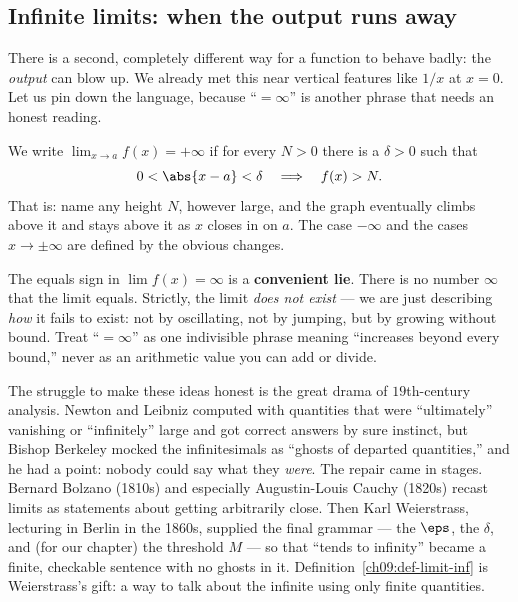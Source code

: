 \subsection{Infinite limits: when the output runs away}

There is a second, completely different way for a function to behave badly: the
\emph{output} can blow up. We already met this near vertical features like
$1/x$ at $x=0$. Let us pin down the language, because ``$=\infty$'' is another
phrase that needs an honest reading.

\begin{definition}
\label{ch09:def-inf-limit}
We write $\displaystyle\lim_{x\to a} f(x) = +\infty$ if for every $N>0$ there is
a $\delta>0$ such that
\[
  0 < \abs{x-a} < \delta \quad\Longrightarrow\quad f(x) > N .
\]
That is: name any height $N$, however large, and the graph eventually climbs
above it and stays above it as $x$ closes in on $a$. The case $-\infty$ and the
cases $x\to\pm\infty$ are defined by the obvious changes.
\end{definition}

\begin{trapbox}
The equals sign in $\lim f(x) = \infty$ is a \textbf{convenient lie}. There is
no number $\infty$ that the limit equals. Strictly, the limit \emph{does not
exist} --- we are just describing \emph{how} it fails to exist: not by
oscillating, not by jumping, but by growing without bound. Treat ``$=\infty$''
as one indivisible phrase meaning ``increases beyond every bound,'' never as
an arithmetic value you can add or divide.
\end{trapbox}

\begin{historybox}
The struggle to make these ideas honest is the great drama of $19$th-century
analysis. Newton and Leibniz computed with quantities that were ``ultimately''
vanishing or ``infinitely'' large and got correct answers by sure instinct, but
Bishop Berkeley mocked the infinitesimals as ``ghosts of departed quantities,''
and he had a point: nobody could say what they \emph{were}. The repair came in
stages. Bernard Bolzano (1810s) and especially Augustin-Louis Cauchy (1820s)
recast limits as statements about getting arbitrarily close. Then Karl
Weierstrass, lecturing in Berlin in the 1860s, supplied the final grammar --- the
$\eps$, the $\delta$, and (for our chapter) the threshold $M$ --- so that
``tends to infinity'' became a finite, checkable sentence with no ghosts in it.
Definition~\ref{ch09:def-limit-inf} is Weierstrass's gift: a way to talk about
the infinite using only finite quantities.
\end{historybox}

